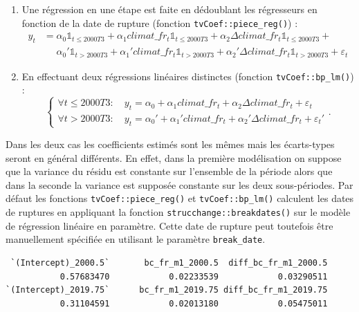 \documentclass[
  a4paper,
  DIV=11,
  numbers=noendperiod,
  french]{scrartcl}
\newenvironment{Shaded}{\begin{snugshade}}{\end{snugshade}}
\newcommand{\FunctionTok}[1]{\textcolor[rgb]{0.28,0.35,0.67}{#1}}
\newcommand{\NormalTok}[1]{\textcolor[rgb]{0.00,0.23,0.31}{#1}}
\newcommand{\OtherTok}[1]{\textcolor[rgb]{0.00,0.23,0.31}{#1}}
\newcommand{\SpecialCharTok}[1]{\textcolor[rgb]{0.37,0.37,0.37}{#1}}
\newcommand\1{{\mathds 1}}
\theoremstyle{remark}
\begin{document}
\begin{enumerate}
\def\labelenumi{\arabic{enumi}.}
\item
  Une régression en une étape est faite en dédoublant les régresseurs en
  fonction de la date de rupture (fonction
  \texttt{tvCoef::piece\_reg()}) : \begin{align*}
  y_t &= \alpha_0\1_{t\leq 2000T3} + \alpha_1 climat\_fr_t\1_{t\leq 2000T3} + \alpha_2 \Delta climat\_fr_t\1_{t\leq 2000T3} + \\
  &\phantom{=} \alpha_0'\1_{t > 2000T3} + \alpha_1' climat\_fr_t\1_{t > 2000T3} + \alpha_2' \Delta climat\_fr_t\1_{t > 2000T3} + \varepsilon_t
  \end{align*}
\item
  En effectuant deux régressions linéaires distinctes (fonction
  \texttt{tvCoef::bp\_lm()}) : \[
  \begin{cases}
  \forall t \leq 2000T3 :\quad y_t = \alpha_0 + \alpha_1 climat\_fr_t + \alpha_2 \Delta climat\_fr_t + \varepsilon_t \\
  \forall t > 2000T3 :\quad y_t = \alpha_0' + \alpha_1' climat\_fr_t + \alpha_2' \Delta climat\_fr_t + \varepsilon_t'
  \end{cases}.
  \]
\end{enumerate}

Dans les deux cas les coefficients estimés sont les mêmes mais les
écarts-types seront en général différents. En effet, dans la première
modélisation on suppose que la variance du résidu est constante sur
l'ensemble de la période alors que dans la seconde la variance est
supposée constante sur les deux sous-périodes. Par défaut les fonctions
\texttt{tvCoef::piece\_reg()} et \texttt{tvCoef::bp\_lm()} calculent les
dates de ruptures en appliquant la fonction
\texttt{strucchange::breakdates()} sur le modèle de régression linéaire
en paramètre. Cette date de rupture peut toutefois être manuellement
spécifiée en utilisant le paramètre \texttt{break\_date}.

\begin{Shaded}
\end{Shaded}

\begin{verbatim}
 `(Intercept)_2000.5`       bc_fr_m1_2000.5  diff_bc_fr_m1_2000.5 
           0.57683470            0.02233539            0.03290511 
`(Intercept)_2019.75`      bc_fr_m1_2019.75 diff_bc_fr_m1_2019.75 
           0.31104591            0.02013180            0.05475011 
\end{verbatim}
\end{document}
